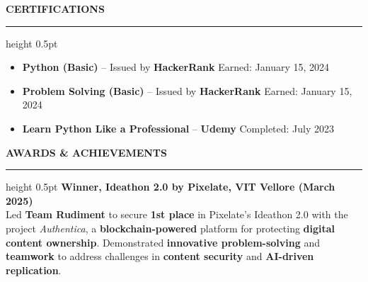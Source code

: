\documentclass[10pt]{article}
\newcommand{\sectionrule}{\vspace{3pt}\hrule height 0.5pt \vspace{4pt}}
\newcommand{\ressection}[1]{\vspace{1pt}\textbf{#1}\sectionrule}
\begin{document}
\ressection{CERTIFICATIONS}
\begin{itemize}
  \item \textbf{Python (Basic)} – Issued by \textbf{HackerRank} \hfill Earned: January 15, 2024
  \item \textbf{Problem Solving (Basic)} – Issued by \textbf{HackerRank} \hfill Earned: January 15, 2024
  \item \textbf{Learn Python Like a Professional} – \textbf{Udemy} \hfill Completed: July 2023
\end{itemize}

\ressection{AWARDS \& ACHIEVEMENTS}
\textbf{Winner, Ideathon 2.0 by Pixelate, VIT Vellore (March 2025)}\\
Led \textbf{Team Rudiment} to secure \textbf{1st place} in Pixelate’s Ideathon 2.0 with the project \textit{Authentica}, a \textbf{blockchain-powered} platform for protecting \textbf{digital content ownership}. Demonstrated \textbf{innovative problem-solving} and \textbf{teamwork} to address challenges in \textbf{content security} and \textbf{AI-driven replication}.
\end{document}
